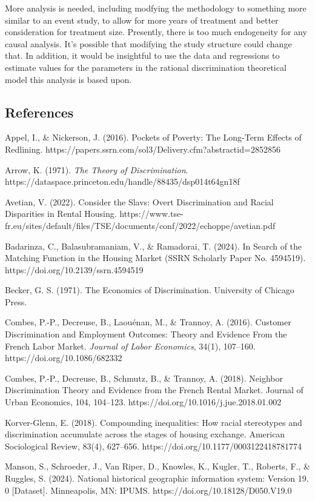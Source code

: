 \documentclass[11pt]{article}
\begin{document}
    More analysis is needed, including modfying the methodology to something more similar to an event study, to allow for more years of treatment and better consideration for treatment size. Presently, there is too much endogeneity for any causal analysis. It's possible that modifying the study structure could change that. In addition, it would be insightful to use the data and regressions to estimate values for the parameters in the rational discrimination theoretical model this analysis is based upon.
\subsection{References}\label{references}

Appel, I., \& Nickerson, J. (2016). Pockets of Poverty: The Long-Term Effects of Redlining. https://papers.ssrn.com/sol3/Delivery.cfm?abstractid=2852856

Arrow, K. (1971). \textit{The Theory of Discrimination}. \\
https://dataspace.princeton.edu/handle/88435/dsp014t64gn18f

Avetian, V. (2022). Consider the Slavs: Overt Discrimination and Racial Disparities in Rental Housing. https://www.tse-fr.eu/sites/default/files/TSE/documents/conf/2022/echoppe/avetian.pdf

Badarinza, C., Balasubramaniam, V., \& Ramadorai, T. (2024). In Search of the Matching Function in the Housing Market (SSRN Scholarly Paper No. 4594519). https://doi.org/10.2139/ssrn.4594519

Becker, G. S. (1971). The Economics of Discrimination. University of Chicago Press.

Combes, P.-P., Decreuse, B., Laouénan, M., \& Trannoy, A. (2016). Customer Discrimination and Employment Outcomes: Theory and Evidence From the French Labor Market. \textit{Journal of Labor Economics}, 34(1), 107–160. https://doi.org/10.1086/682332

Combes, P.-P., Decreuse, B., Schmutz, B., \& Trannoy, A. (2018). Neighbor Discrimination Theory and Evidence from the French Rental Market. Journal of Urban Economics, 104, 104–123. https://doi.org/10.1016/j.jue.2018.01.002

Korver-Glenn, E. (2018). Compounding inequalities: How racial stereotypes and discrimination accumulate across the stages of housing exchange. American Sociological Review, 83(4), 627–656. https://doi.org/10.1177/0003122418781774

Manson, S., Schroeder, J., Van Riper, D., Knowles, K., Kugler, T., Roberts, F., \& Ruggles, S. (2024). National historical geographic information system: Version 19. 0 [Dataset]. Minneapolis, MN: IPUMS. https://doi.org/10.18128/D050.V19.0
\end{document}
